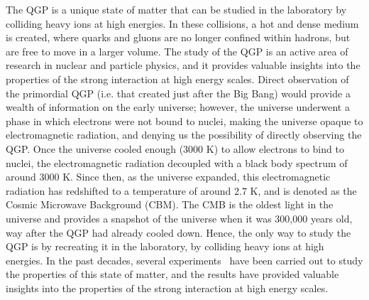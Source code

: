 The QGP is a unique state of matter that can be studied in the laboratory by colliding heavy ions at high energies. In these collisions, a hot and dense medium is created, where quarks and gluons are no longer confined within hadrons, but are free to move in a larger volume. The study of the QGP is an active area of research in nuclear and particle physics, and it provides valuable insights into the properties of the strong interaction at high energy scales.
Direct observation of the primordial QGP (i.e. that created just after the Big Bang) would provide a wealth of information on the early universe; however, the universe underwent a phase in which electrons were not bound to nuclei, making the universe opaque to electromagnetic radiation, and denying us the possibility of directly observing the QGP. Once the universe cooled enough (3000 K) to allow electrons to bind to nuclei, the electromagnetic radiation decoupled with a black body spectrum of around 3000 K. Since then, as the universe expanded, this electromagnetic radiation has redshifted to a temperature of around 2.7 K, and is denoted as the Cosmic Microwave Background (CBM). The CMB is the oldest light in the universe and provides a snapshot of the universe when it was 300,000 years old, way after the QGP had already cooled down. Hence, the only way to study the QGP is by recreating it in the laboratory, by colliding heavy ions at high energies. In the past decades, several experiments~\cite{ALICE:2022wpn, NA38:2000wlp, NA50:1997hlx, Nouicer:2009fy} have been carried out to study the properties of this state of matter, and the results have provided valuable insights into the properties of the strong interaction at high energy scales.

